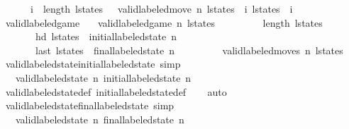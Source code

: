 \begin{isabellebody}
\ \ \ \ \ {\isacharparenleft}{\isasymforall}\ i\ {\isacharless}\ length\ l{\isacharunderscore}states\ {\isacharminus}\ {}{\isachardot}\ valid{\isacharunderscore}labeled{\isacharunderscore}move\ n\ {\isacharparenleft}l{\isacharunderscore}states\ {\isacharbang}\ i{\isacharparenright}\ {\isacharparenleft}l{\isacharunderscore}states\ {\isacharbang}\ {\isacharparenleft}i\ {\isacharplus}\ {}{\isacharparenright}{\isacharparenright}{\isacharparenright}{\isachardoublequoteclose}\isanewline
\isanewline
{}\isamarkupfalse%
\ valid{\isacharunderscore}labeled{\isacharunderscore}game\ \isanewline
\ \ {\isachardoublequoteopen}valid{\isacharunderscore}labeled{\isacharunderscore}game\ n\ l{\isacharunderscore}states\ {\isasymlongleftrightarrow}\ \isanewline
\ \ \ \ \ \ \ length\ l{\isacharunderscore}states\ {\isasymge}\ {}\ {\isasymand}\isanewline
\ \ \ \ \ \ \ hd\ l{\isacharunderscore}states\ {\isacharequal}\ initial{\isacharunderscore}labeled{\isacharunderscore}state\ n\ {\isasymand}\ \isanewline
\ \ \ \ \ \ \ last\ l{\isacharunderscore}states\ {\isacharequal}\ final{\isacharunderscore}labeled{\isacharunderscore}state\ n\ {\isasymand}\ \isanewline
\ \ \ \ \ \ \ valid{\isacharunderscore}labeled{\isacharunderscore}moves\ n\ l{\isacharunderscore}states{\isachardoublequoteclose}\isanewline
\isanewline
{}\isamarkupfalse%
\ valid{\isacharunderscore}labeled{\isacharunderscore}state{\isacharunderscore}initial{\isacharunderscore}labeled{\isacharunderscore}state\ {\isacharbrackleft}simp{\isacharbrackright}{\isacharcolon}\isanewline
\ \ \ {\isachardoublequoteopen}valid{\isacharunderscore}labeled{\isacharunderscore}state\ n\ {\isacharparenleft}initial{\isacharunderscore}labeled{\isacharunderscore}state\ n{\isacharparenright}{\isachardoublequoteclose}\isanewline
%
\isadelimproof
\ \ %
\endisadelimproof
%
\isatagproof
{}\isamarkupfalse%
\ valid{\isacharunderscore}labeled{\isacharunderscore}state{\isacharunderscore}def\ initial{\isacharunderscore}labeled{\isacharunderscore}state{\isacharunderscore}def\isanewline
\ \ \isamarkupfalse%
\ auto%
\endisatagproof
{\isafoldproof}%
%
\isadelimproof
\isanewline
%
\endisadelimproof
\isanewline
{}\isamarkupfalse%
\ valid{\isacharunderscore}labeled{\isacharunderscore}state{\isacharunderscore}final{\isacharunderscore}labeled{\isacharunderscore}state\ {\isacharbrackleft}simp{\isacharbrackright}{\isacharcolon}\isanewline
\ \ \ {\isachardoublequoteopen}valid{\isacharunderscore}labeled{\isacharunderscore}state\ n\ {\isacharparenleft}final{\isacharunderscore}labeled{\isacharunderscore}state\ n{\isacharparenright}{\isachardoublequoteclose}\isanewline

\end{isabellebody}
